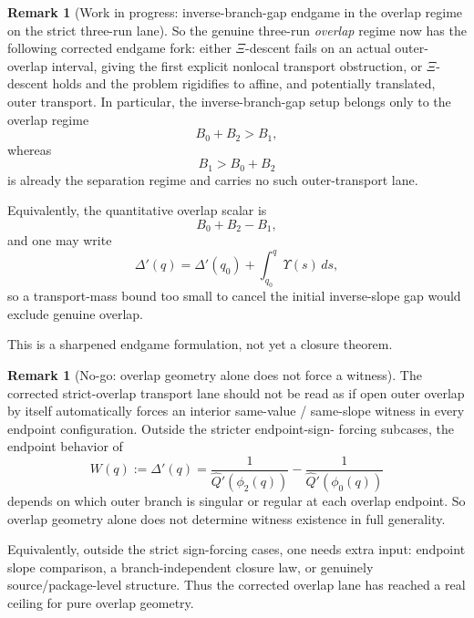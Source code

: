 \documentclass[11pt,a4paper]{amsart}
\theoremstyle{plain}
\theoremstyle{definition}
\newtheorem{remark}[theorem]{Remark}
\begin{document}
\begin{remark}[Work in progress: inverse-branch-gap endgame in the overlap regime on the strict three-run lane]
So the genuine three-run \emph{overlap} regime now has the following corrected
endgame fork: either $\Xi$-descent fails on an actual outer-overlap interval,
giving the first explicit nonlocal transport obstruction, or $\Xi$-descent
holds and the problem rigidifies to affine, and potentially translated, outer
transport. In particular, the inverse-branch-gap setup belongs only to the
overlap regime
\[
B_0+B_2>B_1,
\]
whereas
\[
B_1>B_0+B_2
\]
is already the separation regime and carries no such outer-transport lane.

Equivalently, the quantitative overlap scalar is
\[
B_0+B_2-B_1,
\]
and one may write
\[
\Delta'(q)=\Delta'(q_0)+\int_{q_0}^q \Upsilon(s)\,ds,
\]
so a transport-mass bound too small to cancel the initial inverse-slope gap
would exclude genuine overlap.

This is a sharpened endgame formulation, not yet a closure theorem.
\end{remark}

\begin{remark}[No-go: overlap geometry alone does not force a witness]
\label{rem:no-go-overlap-geometry-alone-does-not-force-witness}
The corrected strict-overlap transport lane should not be read as if open outer
overlap by itself automatically forces an interior same-value / same-slope
witness in every endpoint configuration. Outside the stricter endpoint-sign-
forcing subcases, the endpoint behavior of
\[
W(q):=\Delta'(q)
=
\frac{1}{\widehat Q'(\phi_2(q))}
-
\frac{1}{\widehat Q'(\phi_0(q))}
\]
depends on which outer branch is singular or regular at each overlap endpoint.
So overlap geometry alone does not determine witness existence in full
generality.

Equivalently, outside the strict sign-forcing cases, one needs extra input:
endpoint slope comparison, a branch-independent closure law, or genuinely
source/package-level structure. Thus the corrected overlap lane has reached a
real ceiling for pure overlap geometry.
\end{remark}
\end{document}
